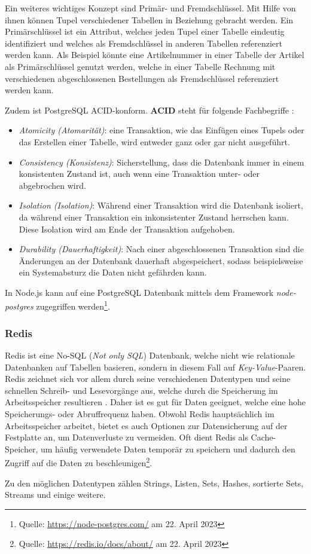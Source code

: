 Ein weiteres wichtiges Konzept sind Primär- und Fremdschlüssel. Mit Hilfe von ihnen können Tupel verschiedener Tabellen in Beziehung gebracht werden. Ein Primärschlüssel ist ein Attribut, welches jeden Tupel einer Tabelle eindeutig identifiziert und welches als Fremdschlüssel in anderen Tabellen referenziert werden kann. Als Beispiel könnte eine Artikelnummer in einer Tabelle der Artikel als Primärschlüssel genutzt werden, welche in einer Tabelle Rechnung mit verschiedenen abgeschlossenen Bestellungen als Fremdschlüssel referenziert werden kann.

Zudem ist PostgreSQL ACID-konform. \textbf{ACID} steht für folgende Fachbegriffe \cite{sql-book}:
\begin{itemize}
 \item \textit{Atomicity (Atomarität)}: eine Transaktion, wie das Einfügen eines Tupels oder das Erstellen einer Tabelle, wird entweder ganz oder gar nicht ausgeführt.
 \item \textit{Consistency (Konsistenz)}: Sicherstellung, dass die Datenbank immer in einem konsistenten Zustand ist, auch wenn eine Transaktion unter- oder abgebrochen wird.
 \item \textit{Isolation (Isolation)}: Während einer Transaktion wird die Datenbank isoliert, da während einer Transaktion ein inkonsistenter Zustand herrschen kann. Diese Isolation wird am Ende der Transaktion aufgehoben.
  \item \textit{Durability (Dauerhaftigkeit)}: Nach einer abgeschlossenen Transaktion sind die Änderungen an der Datenbank dauerhaft abgespeichert, sodass beispielsweise ein Systemabsturz die Daten nicht gefährden kann.
\end{itemize}

In Node.js kann auf eine PostgreSQL Datenbank mittels dem Framework \textit{node-postgres} zugegriffen werden\footnote{Quelle: \url{https://node-postgres.com/} am 22. April 2023}.
        \subsubsection{Redis}
        \label{sec:redis}
        \begin{savenotes}
Redis ist eine No-SQL (\textit{Not only SQL}) Datenbank, welche nicht wie relationale Datenbanken auf Tabellen basieren, sondern in diesem Fall auf \textit{Key-Value}-Paaren. Redis zeichnet sich vor allem durch seine verschiedenen Datentypen und seine schnellen Schreib- und Lesevorgänge aus, welche durch die Speicherung im Arbeitsspeicher resultieren \cite{redis-book}. Daher ist es gut für Daten geeignet, welche eine hohe Speicherungs- oder Abruffrequenz haben. Obwohl Redis hauptsächlich im Arbeitsspeicher arbeitet, bietet es auch Optionen zur Datensicherung auf der Festplatte an, um Datenverluste zu vermeiden. Oft dient Redis als Cache-Speicher, um häufig verwendete Daten temporär zu speichern und dadurch den Zugriff auf die Daten zu beschleunigen\footnote{Quelle: \url{https://redis.io/docs/about/}\label{fn:redis} am 22. April 2023}. 
\end{savenotes}
Zu den möglichen Datentypen zählen Strings, Listen, Sets, Hashes, sortierte Sets, Streams und einige weitere. 	

